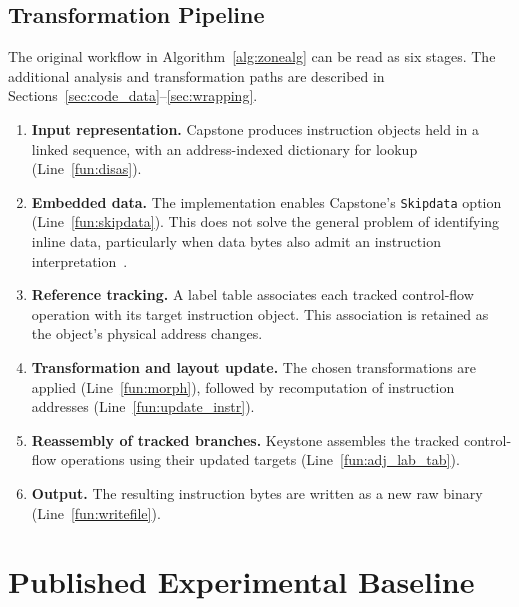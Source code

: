 \documentclass[runningheads]{llncs}
\newif\ifworkingdraft
\newcommand{\draftnote}[1]{\ifworkingdraft\par\smallskip\noindent
 {\color{draftblue}\small\textbf{Draft note.} #1}\par\smallskip\fi}
\begin{document}
\subsection{Transformation Pipeline}
The original workflow in Algorithm~\ref{alg:zonealg} can be read as six stages. The additional analysis and transformation paths are described in Sections~\ref{sec:code_data}--\ref{sec:wrapping}.

\begin{enumerate}
\item \textbf{Input representation.}
    Capstone produces instruction objects held in a linked sequence, with an address-indexed dictionary for lookup (Line~\ref{fun:disas}).

\item \textbf{Embedded data.}
    The implementation enables Capstone's \texttt{Skipdata} option (Line~\ref{fun:skipdata}). This does not solve the general problem of identifying inline data, particularly when data bytes also admit an instruction interpretation~\cite{bin2binobf}.

\item \textbf{Reference tracking.}
    A label table associates each tracked control-flow operation with its target instruction object. This association is retained as the object's physical address changes.

\item \textbf{Transformation and layout update.}
    The chosen transformations are applied (Line~\ref{fun:morph}), followed by recomputation of instruction addresses (Line~\ref{fun:update_instr}).

\item \textbf{Reassembly of tracked branches.}
    Keystone assembles the tracked control-flow operations using their updated targets (Line~\ref{fun:adj_lab_tab}).

\item \textbf{Output.}
    The resulting instruction bytes are written as a new raw binary (Line~\ref{fun:writefile}).

\end{enumerate}

\section{Published Experimental Baseline}\label{sec:results}
\draftnote{The detailed historical plots and their reported numerical
values are retained from the preparation manuscript. Some category/value
associations in the detection and working-rate plots, and the provenance
of the similarity metric, require reconciliation against the conference
version and archived records. These are baseline editorial checks,
not replacement experiments. See \texttt{BASELINE\_CHECKS.md}.}
\end{document}
